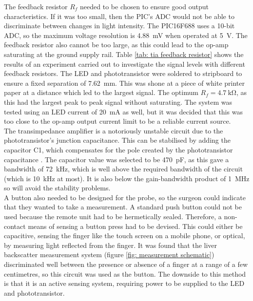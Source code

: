 The feedback resistor $R_f$ needed to be chosen to ensure good output characteristics. If it was too small, then the PIC's ADC would not be able to discriminate between changes in light intensity.  The PIC16F688 uses a 10-bit ADC, so the maximum voltage resolution is \SI{4.88}{\milli\volt} when operated at \SI{5}{\volt}. The feedback resistor also cannot be too large, as this could lead to the op-amp saturating at the ground supply rail. Table \ref{tab: tia feedback resistor} shows the results of an experiment carried out to investigate the signal levels with different feedback resistors. The LED and phototransistor were soldered to stripboard to ensure  a fixed separation of \SI{7.62}{\milli\metre}. This was shone at a piece of white printer paper at a distance which led to the largest signal. The optimum $R_f = \SI{4.7}{\kilo\ohm}$, as this had the largest peak to peak signal without saturating. The system was tested using an LED current of \SI{20}{\milli\ampere} as well, but it was decided that this was too close to the op-amp output current limit to be a reliable current source.\\

The transimpedance amplifier is a notoriously unstable circuit due to the phototransistor's junction capacitance. This can be stabilised by adding the capacitor C1, which compensates for the pole created by the phototransistor capacitance \cite{tia_stability}. The capacitor value was selected to be \SI{470}{\pico\farad}, as this gave a bandwidth of \SI{72}{\kilo\hertz}, which is well above the required bandwidth of the circuit (which is \SI{10}{\kilo\hertz} at most). It is also below the gain-bandwidth product of \SI{1}{\mega\hertz} so will avoid the stability problems.\\

A button also needed to be designed for the probe, so the surgeon could indicate that they wanted to take a measurement. A standard push button could not be used because the remote unit had to be hermetically sealed. Therefore, a non-contact means of sensing a button press had to be devised. This could either be capacitive, sensing the finger like the touch screen on a mobile phone, or optical, by measuring light reflected from the finger. It was found that the liver backscatter measurement system (figure \ref{fig: measurement schematic}) discriminated well between the presence or absence of a finger at a range of a few centimetres, so this circuit was used as the button. The downside to this method is that it is an active sensing system, requiring power to be supplied to the LED and phototransistor.\\

